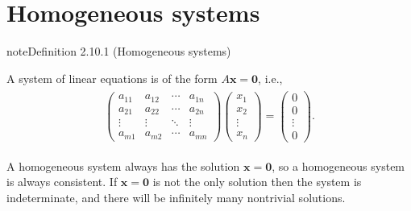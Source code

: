 \documentclass[letterpaper,10pt,english]{jupyterBook}
\begin{document}
\section{Homogeneous systems}
\label{\detokenize{_pages/2.7_Homogeneous_systems:homogeneous-systems}}\label{\detokenize{_pages/2.7_Homogeneous_systems:index-1}}\label{\detokenize{_pages/2.7_Homogeneous_systems:index-0}}\label{\detokenize{_pages/2.7_Homogeneous_systems:homogeneous-systems-section}}\label{\detokenize{_pages/2.7_Homogeneous_systems::doc}}\label{_pages/2.7_Homogeneous_systems:homogeneous-system-definition}
\begin{sphinxadmonition}{note}{Definition 2.10.1 (Homogeneous systems)}



\sphinxAtStartPar
A  system of linear equations is of the form \(A\mathbf{x} = \mathbf{0}\), i.e.,
\begin{equation*}
\begin{split} \begin{align*}
    \begin{pmatrix}
        a_{11} & a_{12} & \cdots & a_{1n} \\
        a_{21} & a_{22} & \cdots & a_{2n} \\
        \vdots & \vdots & \ddots & \vdots \\
        a_{m1} & a_{m2} & \cdots & a_{mn}
    \end{pmatrix}
    \begin{pmatrix} x_1 \\ x_2 \\ \vdots \\ x_n \end{pmatrix} = 
    \begin{pmatrix} 0 \\ 0 \\ \vdots \\ 0 \end{pmatrix}.
\end{align*} \end{split}
\end{equation*}\end{sphinxadmonition}

\sphinxAtStartPar
A homogeneous system always has the  solution \(\mathbf{x} = \mathbf{0}\), so a homogeneous system is always consistent. If \(\mathbf{x} = \mathbf{0}\) is not the only solution then the system is indeterminate, and there will be infinitely many non\sphinxhyphen{}trivial solutions.
\end{document}

